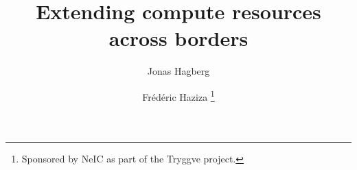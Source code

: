 
\title{Extending compute resources across borders}

\author{%
Jonas Hagberg %
\and %
Fr\'ed\'eric Haziza %
\thanks{Sponsored by NeIC as part of the Tryggve project.}
}


